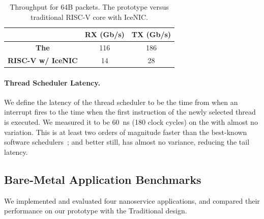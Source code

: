\begin{table}
\begin{center}
\begin{tabular}{c|c|c}
                          & \textbf{RX (Gb/s)} & \textbf{TX (Gb/s)} \\ \toprule
\textbf{The \name{}}     & 116                & 186                \\
\textbf{RISC-V w/ IceNIC} & 14                 & 28                 \\
\end{tabular}
\vspace{5pt}
\caption{Throughput for 64B packets. The \name{} prototype versus traditional RISC-V core with IceNIC.}
\label{tab:throughput}
\end{center}
\end{table}


\paragraph{Thread Scheduler Latency.} We define the latency of the thread scheduler to be the time from when an interrupt fires to the time when the first instruction of the newly selected thread is executed.
We measured it to be \SI{60}{ns} (180 clock cycles) on the \name{} with almost no variation. This is at least two orders of magnitude faster than the best-known software schedulers~\cite{shenango}; and better still, has almost no variance, reducing the tail latency.

\subsection{Bare-Metal Application Benchmarks}
\label{ssec:bare-metal-evals}
We implemented and evaluated four nanoservice applications, and compared their performance on our \name{} prototype with the Traditional design. 


